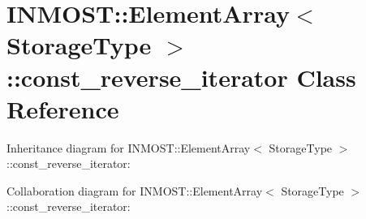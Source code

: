 \hypertarget{classINMOST_1_1ElementArray_1_1const__reverse__iterator}{\section{I\-N\-M\-O\-S\-T\-:\-:Element\-Array$<$ Storage\-Type $>$\-:\-:const\-\_\-reverse\-\_\-iterator Class Reference}
\label{classINMOST_1_1ElementArray_1_1const__reverse__iterator}
}


Inheritance diagram for I\-N\-M\-O\-S\-T\-:\-:Element\-Array$<$ Storage\-Type $>$\-:\-:const\-\_\-reverse\-\_\-iterator\-:


Collaboration diagram for I\-N\-M\-O\-S\-T\-:\-:Element\-Array$<$ Storage\-Type $>$\-:\-:const\-\_\-reverse\-\_\-iterator\-:
